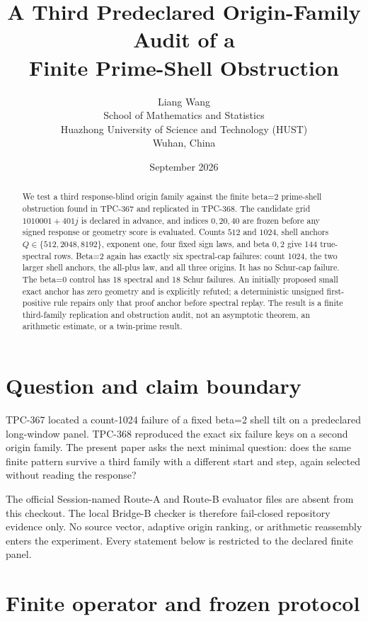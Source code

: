 \documentclass[10pt]{article}
\title{A Third Predeclared Origin-Family Audit of a\\
Finite Prime-Shell Obstruction}
\author{Liang Wang\\
\small School of Mathematics and Statistics\\
\small Huazhong University of Science and Technology (HUST)\\
\small Wuhan, China}
\date{September 2026}
\begin{document}
\maketitle

\begin{abstract}
We test a third response-blind origin family against the finite beta=2
prime-shell obstruction found in TPC-367 and replicated in TPC-368.  The
candidate grid $1010001+401j$ is declared in advance, and indices $0,20,40$
are frozen before any signed response or geometry score is evaluated.  Counts
$512$ and $1024$, shell anchors $Q\in\{512,2048,8192\}$, exponent one, four
fixed sign laws, and beta $0,2$ give 144 true-spectral rows.  Beta=2 again has
exactly six spectral-cap failures: count 1024, the two larger shell anchors,
the all-plus law, and all three origins.  It has no Schur-cap failure.  The
beta=0 control has 18 spectral and 18 Schur failures.  An initially proposed
small exact anchor has zero geometry and is explicitly refuted; a deterministic
unsigned first-positive rule repairs only that proof anchor before spectral
replay.  The result is a finite third-family replication and obstruction
audit, not an asymptotic theorem, an arithmetic estimate, or a twin-prime
result.
\end{abstract}

\section{Question and claim boundary}

TPC-367 located a count-1024 failure of a fixed beta=2 shell tilt on a
predeclared long-window panel.  TPC-368 reproduced the exact six failure keys
on a second origin family.  The present paper asks the next minimal question:
does the same finite pattern survive a third family with a different start and
step, again selected without reading the response?

The official Session-named Route-A and Route-B evaluator files are absent
from this checkout.  The local Bridge-B checker is therefore fail-closed
repository evidence only.  No source vector, adaptive origin ranking, or
arithmetic reassembly enters the experiment.  Every statement below is
restricted to the declared finite panel.

\section{Finite operator and frozen protocol}
\end{document}

